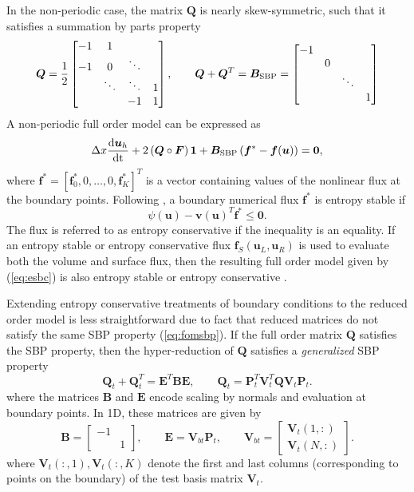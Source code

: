 \documentclass[review]{siamart171218}
\theoremstyle{assumption}
\newcommand{\td}[2]{\frac{{\rm d}#1}{{\rm d}{\rm #2}}}
\newcommand{\LRp}[1]{\left( #1 \right)}
\newcommand{\LRs}[1]{\left[ #1 \right]}
\begin{document}
In the non-periodic case, the matrix $\bm{Q}$ is nearly skew-symmetric, such that it satisfies a summation by parts property
\begin{equation}
\bm{Q} = \frac{1}{2}\begin{bmatrix}
-1 & 1 & & \\
-1 & 0 & \ddots &\\
 &\ddots &\ddots &1\\
  & & -1 &1\\
\end{bmatrix}, \qquad \bm{Q} + \bm{Q}^T = \bm{B}_{\rm SBP} = 
\begin{bmatrix}
-1& && \\
&0 &&\\
& &\ddots &\\
& &&1\\
\end{bmatrix}
\label{eq:fomsbp}
\end{equation}
A non-periodic full order model can be expressed as 
\begin{align}
\Delta x \td{\bm{u}_h}{t} + 2\LRp{{\bm{Q}}\circ \bm{F}}\bm{1} + \bm{B}_{\rm SBP}\LRp{\bm{f}^* - \bm{f}(\bm{u})} = \bm{0},
\label{eq:esbc}
\end{align}
where $\bm{f}^* = \LRs{\bm{f}^*_0, 0,\ldots, 0, \bm{f}^*_K}^T$ is a vector containing values of the nonlinear flux at the boundary points.  
Following \cite{chen2017entropy}, a boundary numerical flux $\bm{f}^*$ is entropy stable if 
\begin{equation}
\psi\LRp{\bm{u}} - \bm{v}(\bm{u})^T\bm{f}^* \leq \bm{0}.%
\label{eq:esbflux}
\end{equation}
The flux is referred to as entropy conservative if the inequality is an equality.  If an entropy stable or entropy conservative flux $\bm{f}_S(\bm{u}_L,\bm{u}_R)$ is used to evaluate both the volume and surface flux, then the resulting full order model given by (\ref{eq:esbc}) is also entropy stable or entropy conservative \cite{tadmor1987numerical, parsani2015entropy, chen2017entropy}.  

Extending entropy conservative treatments of boundary conditions to the reduced order model is less straightforward due to fact that reduced matrices do not satisfy the same SBP property (\ref{eq:fomsbp}).  If the full order matrix $\bm{Q}$ satisfies the SBP property, then the hyper-reduction of $\bm{Q}$ satisfies a \textit{generalized} SBP property \cite{fernandez2014generalized} 
\[
\bm{Q}_t + \bm{Q}_t^T = \bm{E}^T\bm{B}\bm{E}, \qquad \bm{Q}_t = \bm{P}_t^T\bm{V}_t^T\bm{Q}\bm{V}_t\bm{P}_t.
\]
where the matrices $\bm{B}$ and $\bm{E}$ encode scaling by normals and evaluation at boundary points.  In 1D, these matrices are given by
\[
\bm{B} = \begin{bmatrix}-1 & \\ & 1\end{bmatrix}, \qquad \bm{E} = \bm{V}_{bt}\bm{P}_t, \qquad \bm{V}_{bt} = \begin{bmatrix}\bm{V}_t(1,:) \\ \bm{V}_t(N,:)\end{bmatrix}.
\]
where $\bm{V}_t(:,1), \bm{V}_t(:,K)$ denote the first and last columns (corresponding to points on the boundary) of the test basis matrix $\bm{V}_t$.  
\end{document}
